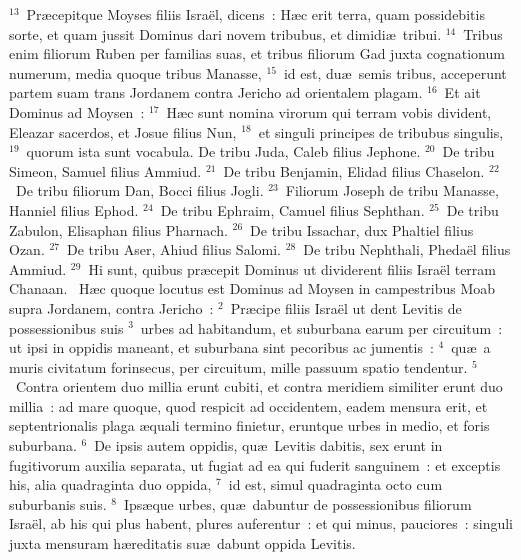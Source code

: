 ${}^{13}$~Pr\ae cepitque Moyses filiis Isra\"el, dicens~: H\ae c erit terra, quam possidebitis sorte, et quam jussit Dominus dari novem tribubus, et dimidi\ae\ tribui.
${}^{14}$~Tribus enim filiorum Ruben per familias suas, et tribus filiorum Gad juxta cognationum numerum, media quoque tribus Manasse,
${}^{15}$~id est, du\ae\ semis tribus, acceperunt partem suam trans Jordanem contra Jericho ad orientalem plagam.
${}^{16}$~Et ait Dominus ad Moysen~:
${}^{17}$~H\ae c sunt nomina virorum qui terram vobis divident, Eleazar sacerdos, et Josue filius Nun,
${}^{18}$~et singuli principes de tribubus singulis,
${}^{19}$~quorum ista sunt vocabula. De tribu Juda, Caleb filius Jephone.
${}^{20}$~De tribu Simeon, Samuel filius Ammiud.
${}^{21}$~De tribu Benjamin, Elidad filius Chaselon.
${}^{22}$~De tribu filiorum Dan, Bocci filius Jogli.
${}^{23}$~Filiorum Joseph de tribu Manasse, Hanniel filius Ephod.
${}^{24}$~De tribu Ephraim, Camuel filius Sephthan.
${}^{25}$~De tribu Zabulon, Elisaphan filius Pharnach.
${}^{26}$~De tribu Issachar, dux Phaltiel filius Ozan.
${}^{27}$~De tribu Aser, Ahiud filius Salomi.
${}^{28}$~De tribu Nephthali, Pheda\"el filius Ammiud.
${}^{29}$~Hi sunt, quibus pr\ae cepit Dominus ut dividerent filiis Isra\"el terram Chanaan.
~\lettrine[lines=10,image=true,loversize=0.05,lraise=-0.03]{H}{}\ae c quoque locutus est Dominus ad Moysen in campestribus Moab supra Jordanem, contra Jericho~:
${}^{2}$~Pr\ae cipe filiis Isra\"el ut dent Levitis de possessionibus suis
${}^{3}$~urbes ad habitandum, et suburbana earum per circuitum~: ut ipsi in oppidis maneant, et suburbana sint pecoribus ac jumentis~:
${}^{4}$~qu\ae\ a muris civitatum forinsecus, per circuitum, mille passuum spatio tendentur.
${}^{5}$~Contra orientem duo millia erunt cubiti, et contra meridiem similiter erunt duo millia~: ad mare quoque, quod respicit ad occidentem, eadem mensura erit, et septentrionalis plaga \ae quali termino finietur, eruntque urbes in medio, et foris suburbana.
${}^{6}$~De ipsis autem oppidis, qu\ae\ Levitis dabitis, sex erunt in fugitivorum auxilia separata, ut fugiat ad ea qui fuderit sanguinem~: et exceptis his, alia quadraginta duo oppida,
${}^{7}$~id est, simul quadraginta octo cum suburbanis suis.
${}^{8}$~Ips\ae que urbes, qu\ae\ dabuntur de possessionibus filiorum Isra\"el, ab his qui plus habent, plures auferentur~: et qui minus, pauciores~: singuli juxta mensuram h\ae reditatis su\ae\ dabunt oppida Levitis.


